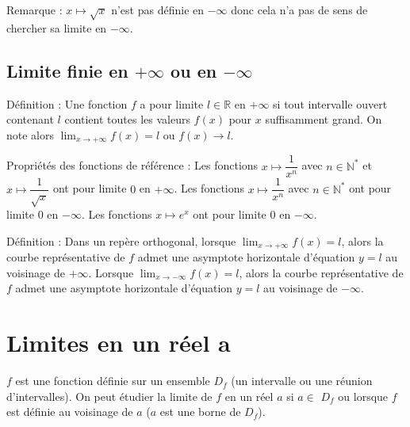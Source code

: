 \documentclass[11pt,a4paper]{article}
\begin{document}
\begin{boiteRemarque}{Remarque :}
    $x\mapsto \sqrt{x}$ n'est pas définie en $-\infty$ donc cela n'a pas de sens de chercher sa limite en $-\infty$.
\end{boiteRemarque}

\subsection{Limite finie en $+\infty$ ou en $-\infty$}

\begin{boiteDef}{Définition :}
    Une fonction $f$ a pour limite $l\in\mathbb{R}$ en $+\infty$ si tout intervalle ouvert contenant $l$ contient toutes les valeurs $f(x)$ pour $x$ suffisamment grand.
    \newline
    On note alors $\displaystyle \lim_{x \to +\infty} f(x) = l$ ou $f(x) \to l$.
\end{boiteDef}

\begin{boiteProp}{Propriétés des fonctions de référence :}
    Les fonctions $x\mapsto \dfrac{1}{x^n}$ avec $n\in\mathbb{N}^*$ et $x\mapsto \dfrac{1}{\sqrt{x}}$ ont pour limite $0$ en $+\infty$.
    \newline
    Les fonctions $x\mapsto \dfrac{1}{x^n}$ avec $n\in\mathbb{N}^*$ ont pour limite $0$ en $-\infty$.
    \newline
    Les fonctions $x\mapsto e^x$ ont pour limite $0$ en $-\infty$.
\end{boiteProp}

\begin{boiteDef}{Définition :}
    Dans un repère orthogonal, lorsque $\displaystyle \lim_{x\to +\infty} f(x) = l$, alors la courbe représentative de $f$ admet une asymptote horizontale d'équation $y=l$ au voisinage de $+\infty$.
    \newline
    Lorsque $\displaystyle \lim_{x\to -\infty} f(x) = l$, alors la courbe représentative de $f$ admet une asymptote horizontale d'équation $y=l$ au voisinage de $-\infty$.
\end{boiteDef}

\section{Limites en un réel a}

\begin{flushleft}
    $f$ est une fonction définie sur un ensemble $D_{f}$ (un intervalle ou une réunion d’intervalles).
    On peut étudier la limite de $f$ en un réel $a$ si $a \in $ $D_{f}$ ou lorsque $f$ est définie au voisinage de $a$ ($a$ est une borne
    de $D_{f}$).
\end{flushleft}
\end{document}
